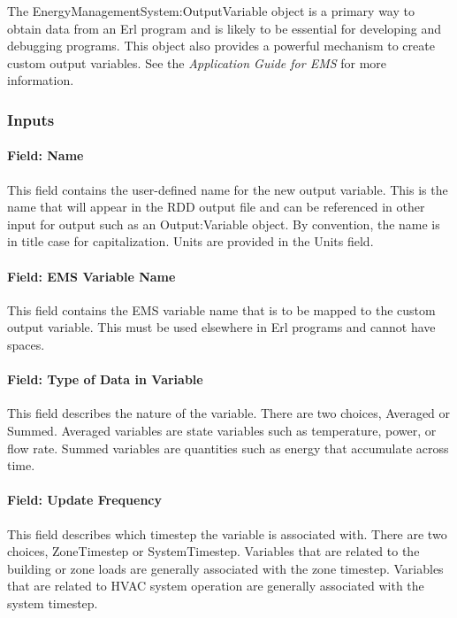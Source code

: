The EnergyManagementSystem:OutputVariable object is a primary way to obtain data from an Erl program and is likely to be essential for developing and debugging programs. This object also provides a powerful mechanism to create custom output variables. See the \emph{Application Guide for EMS} for more information.

\subsubsection{Inputs}\label{inputs-6-008}

\paragraph{Field: Name}\label{field-name-5-008}

This field contains the user-defined name for the new output variable. This is the name that will appear in the RDD output file and can be referenced in other input for output such as an Output:Variable object. By convention, the name is in title case for capitalization. Units are provided in the Units field.

\paragraph{Field: EMS Variable Name}\label{field-ems-variable-name}

This field contains the EMS variable name that is to be mapped to the custom output variable. This must be used elsewhere in Erl programs and cannot have spaces.

\paragraph{Field: Type of Data in Variable}\label{field-type-of-data-in-variable}

This field describes the nature of the variable. There are two choices, Averaged or Summed. Averaged variables are state variables such as temperature, power, or flow rate. Summed variables are quantities such as energy that accumulate across time.

\paragraph{Field: Update Frequency}\label{field-update-frequency}

This field describes which timestep the variable is associated with. There are two choices, ZoneTimestep or SystemTimestep. Variables that are related to the building or zone loads are generally associated with the zone timestep. Variables that are related to HVAC system operation are generally associated with the system timestep.

